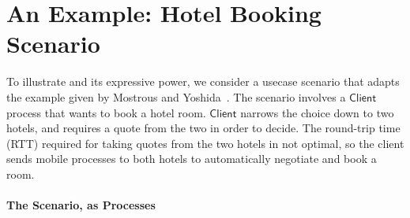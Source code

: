 \newcommand{\Client}{\mathsf{Client}}
\newcommand{\rtype}{\mathsf{room}}
\newcommand{\Quote}{\mathsf{quote}}
\newcommand{\accept}{\mathsf{accept}}
\newcommand{\reject}{\mathsf{reject}}
\newcommand{\creditc}{\mathsf{credit}}

\section{An Example: Hotel Booking Scenario}\label{s:exam}

To illustrate \HOp and its expressive power, 
we consider a usecase scenario that adapts the example given by Mostrous and Yoshida~\cite{tlca07,MostrousY15}.
The scenario involves a $\Client$ process that wants to book
a hotel room. %
$\Client$
narrows the choice down to two hotels, and requires 
 a quote from the two in order to
decide. The round-trip time (RTT) required for
taking quotes from the two hotels in not optimal, %
so the client sends mobile processes to both hotels
to automatically negotiate and book a room. 

\paragraph{The Scenario, as \HOp Processes}\label{appss:exam}


